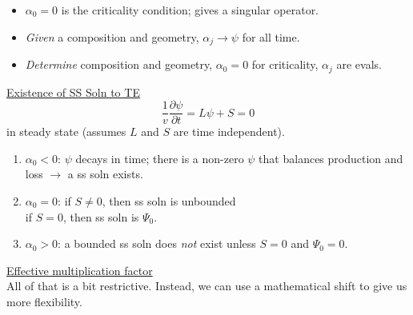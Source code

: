 \documentclass[12pt]{article}
\begin{document}
\begin{itemize}
\item $\alpha_0 = 0$ is the criticality condition; gives a singular operator.
\item \textit{Given} a composition and geometry, $\alpha_j \rightarrow \psi$ for all time.
\item \textit{Determine} composition and geometry, $\alpha_0 = 0$ for criticality, $\alpha_j$ are evals.
\end{itemize}

\vspace*{1 em}
\underline{Existence of SS Soln to TE}
\[\frac{1}{v}\frac{\partial \psi}{\partial t} = L\psi + S = 0\]
in steady state (assumes $L$ and $S$ are time independent).

\begin{enumerate}
\item $\alpha_0 < 0$: $\psi$ decays in time; there is a non-zero $\psi$ that balances production and loss $\rightarrow$ a ss soln exists.
\item $\alpha_0 = 0$: if $S \neq 0$, then ss soln is unbounded \\
\hspace*{3.5 em}if $S=0$, then ss soln is $\Psi_0$.
\item $\alpha_0 > 0$: a bounded ss soln does \textit{not} exist unless $S=0$ and $\Psi_0 = 0$.
\end{enumerate}

\vspace*{1 em}
\underline{Effective multiplication factor}\\
All of that is a bit restrictive. 
Instead, we can use a mathematical shift to give us more flexibility. 
\end{document}
